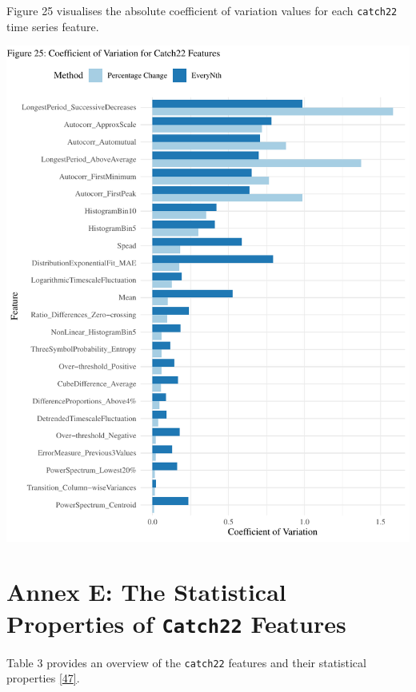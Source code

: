 \documentclass{article}
\begin{document}
\vspace{-0.3cm}

Figure 25 visualises the absolute coefficient of variation values for
each \texttt{catch22} time series feature.

\includegraphics{210431461_CSC8639_Dissertation_files/figure-latex/unnamed-chunk-21-1.pdf}

\newpage

\hypertarget{annex-e-the-statistical-properties-of-catch22-features}{%
\section{\texorpdfstring{Annex E: The Statistical Properties of
\texttt{Catch22}
Features}{Annex E: The Statistical Properties of Catch22 Features}}\label{annex-e-the-statistical-properties-of-catch22-features}}

\vspace{-2.8cm}

Table 3 provides an overview of the \texttt{catch22} features and their
statistical properties \protect\hyperlink{ref-feature_book}{{[}47{]}}.
\end{document}

